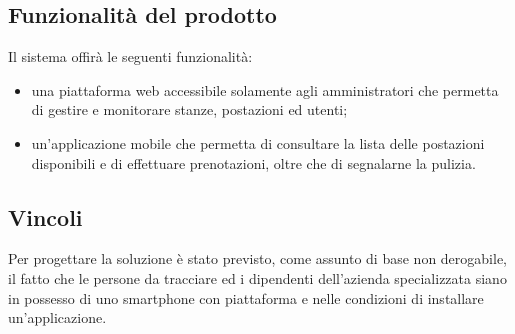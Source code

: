 \subsection{Funzionalit\`{a} del prodotto}
Il sistema \emph{\NomeProgetto} offir\`{a} le seguenti funzionalit\`{a}:
\begin{itemize}
    \item una piattaforma web accessibile solamente agli amministratori che permetta di gestire e monitorare stanze, postazioni ed utenti;
    \item un'applicazione mobile che permetta di consultare la lista delle postazioni disponibili e di effettuare prenotazioni, oltre che di segnalarne la pulizia.
\end{itemize}

\subsection{Vincoli}
Per progettare la soluzione è stato previsto, come assunto di base non derogabile, il fatto che le persone
da tracciare ed i dipendenti dell’azienda specializzata siano in possesso di uno smartphone con piattaforma  e nelle condizioni di installare un’applicazione.
